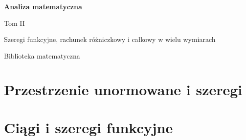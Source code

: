 \documentclass[11pt,a4paper,oneside,openany]{book}
\theoremstyle{plain}
\theoremstyle{definition}
\theoremstyle{remark}
\begin{document}
\frontmatter
\hypersetup{pageanchor=false}
\begin{titlepage}
\centering
\vspace*{4cm}
{\Huge\bfseries Analiza matematyczna\par}
\vspace{.7cm}
{\Large Tom II\par}
\vspace{.7cm}
{\large Szeregi funkcyjne, rachunek różniczkowy i całkowy w wielu wymiarach\par}
\vfill
{\normalsize Biblioteka matematyczna\par}
\end{titlepage}
\hypersetup{pageanchor=true}
\begingroup
\footnotesize\linespread{0.90}\selectfont
\setlength{\parskip}{0pt}
\tableofcontents
\endgroup
\mainmatter
\part{Przestrzenie unormowane i szeregi}







\part{Ciągi i szeregi funkcyjne}





\end{document}
